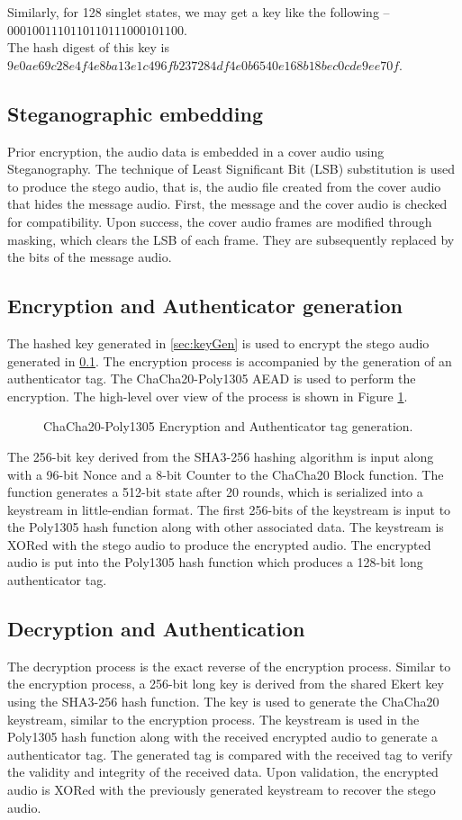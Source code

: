 \documentclass{article}
\begin{document}
Similarly, for 128 singlet states, we may get a key like the following -- $0001001110110110111000101100$. \\
The hash digest of this key is $9e0ae69c28e4f4e8ba13e1c496fb237284df4e0b6540e168b18bec0cde9ee70f$.
\subsection{Steganographic embedding}
\label{sec:stegoEncode}
Prior encryption, the audio data is embedded in a cover audio using Steganography. The technique of Least Significant Bit (LSB) substitution is used to produce the stego audio, that is, the audio file created from the cover audio that hides the message audio. First, the message and the cover audio is checked for compatibility. Upon success, the cover audio frames are modified through masking, which clears the LSB of each frame. They are subsequently replaced by the bits of the message audio.
\subsection{Encryption and Authenticator generation}
\label{sec:chacha20poly1305encryption}
The hashed key generated in \ref{sec:keyGen} is used to encrypt the stego audio generated in \ref{sec:stegoEncode}. The encryption process is accompanied by the generation of an authenticator tag. The ChaCha20-Poly1305 AEAD is used to perform the encryption. The high-level over view of the process is shown in Figure \ref{fig:chacha20poly1305encryption}.
\begin{figure}[!h]
    \centering
    
    \caption{ChaCha20-Poly1305 Encryption and Authenticator tag generation.}
    \label{fig:chacha20poly1305encryption}
\end{figure}

The 256-bit key derived from the SHA3-256 hashing algorithm is input along with a 96-bit Nonce and a 8-bit Counter to the ChaCha20 Block function. The function generates a 512-bit state after 20 rounds, which is serialized into a keystream in little-endian format. The first 256-bits of the keystream is input to the Poly1305 hash function along with other associated data. The keystream is XORed with the stego audio to produce the encrypted audio. The encrypted audio is put into the Poly1305 hash function which produces a 128-bit long authenticator tag.
\subsection{Decryption and Authentication}
\label{sec:chacha20poly1305decryption}
The decryption process is the exact reverse of the encryption process. Similar to the encryption process, a 256-bit long key is derived from the shared Ekert key using the SHA3-256 hash function. The key is used to generate the ChaCha20 keystream, similar to the encryption process. The keystream is used in the Poly1305 hash function along with the received encrypted audio to generate a authenticator tag. The generated tag is compared with the received tag to verify the validity and integrity of the received data. Upon validation, the encrypted audio is XORed with the previously generated keystream to recover the stego audio.
\end{document}
